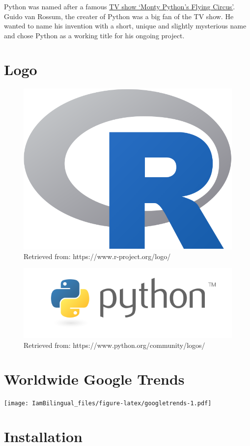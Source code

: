 \documentclass[
]{book}
\begin{document}
Python was named after a famous \href{https://en.wikipedia.org/wiki/Monty_Python\%27s_Flying_Circus}{TV show `Monty Python's Flying Circus'}. Guido van Rossum, the creater of Python was a big fan of the TV show. He wanted to name his invention with a short, unique and slightly mysterious name and chose Python as a working title for his ongoing project.

\hypertarget{logo}{%
\section{Logo}\label{logo}}

\begin{figure}

{\centering \includegraphics[width=0.3\linewidth]{fig/C1_Rlogo} 

}

\caption{Retrieved from: https://www.r-project.org/logo/}\label{fig:unnamed-chunk-1}
\end{figure}

\begin{figure}

{\centering \includegraphics[width=0.6\linewidth]{fig/C1_Pythonlogo} 

}

\caption{Retrieved from: https://www.python.org/community/logos/}\label{fig:unnamed-chunk-2}
\end{figure}

\hypertarget{worldwide-google-trends}{%
\section{Worldwide Google Trends}\label{worldwide-google-trends}}

\texttt{[image: IamBilingual\_files/figure-latex/googletrends-1.pdf]}

\hypertarget{installation}{%
\section{Installation}\label{installation}}
\end{document}
